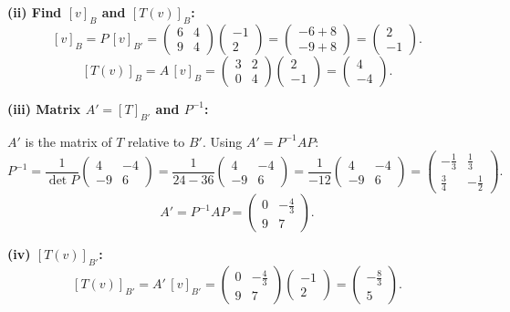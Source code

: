 \documentclass[12pt,a3paper]{article}
\begin{document}
\begin{tcolorbox}
\textbf{(ii) Find $[v]_B$ and $[T(v)]_B$:}
\[
[v]_B=P\,[v]_{B'}=\begin{pmatrix}6&4\\9&4\end{pmatrix}\begin{pmatrix}-1\\2\end{pmatrix}=\begin{pmatrix}-6+8\\-9+8\end{pmatrix}=\begin{pmatrix}2\\-1\end{pmatrix}.
\]
\[
[T(v)]_B=A\,[v]_B=\begin{pmatrix}3&2\\0&4\end{pmatrix}\begin{pmatrix}2\\-1\end{pmatrix}=\begin{pmatrix}4\\-4\end{pmatrix}.
\]

\textbf{(iii) Matrix $A'=[T]_{B'}$ and $P^{-1}$:}

$A'$ is the matrix of $T$ relative to $B'$. Using $A'=P^{-1}AP$:
\[
P^{-1}=\frac{1}{\det P}\begin{pmatrix}4&-4\\-9&6\end{pmatrix}=\frac{1}{24-36}\begin{pmatrix}4&-4\\-9&6\end{pmatrix}=\frac{1}{-12}\begin{pmatrix}4&-4\\-9&6\end{pmatrix}=\begin{pmatrix}-\frac{1}{3}&\frac{1}{3}\\\frac{3}{4}&-\frac{1}{2}\end{pmatrix}.
\]
\[
A'=P^{-1}AP=\begin{pmatrix}0&-\frac{4}{3}\\9&7\end{pmatrix}.
\]

\textbf{(iv) $[T(v)]_{B'}$:}
\[
[T(v)]_{B'}=A'\,[v]_{B'}=\begin{pmatrix}0&-\frac{4}{3}\\9&7\end{pmatrix}\begin{pmatrix}-1\\2\end{pmatrix}=\begin{pmatrix}-\frac{8}{3}\\5\end{pmatrix}.
\]


\end{tcolorbox}
\end{document}
